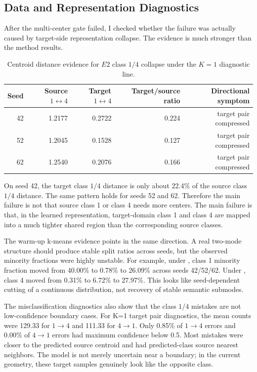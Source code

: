 \documentclass[11pt]{article}
\newcommand{\code}[1]{\texttt{\detokenize{#1}}}
\newcommand{\pct}[1]{#1\%}
\begin{document}
\subsection{Data and Representation Diagnostics}

After the multi-center gate failed, I checked whether the failure was actually caused by target-side representation collapse. The evidence is much stronger than the method results.

\begin{table}[H]
\centering
\small
\caption{Centroid distance evidence for $E2$ class $1/4$ collapse under the $K=1$ diagnostic line.}
\label{tab:centroid}
\begin{tabular}{rrrrr}
\toprule
Seed & Source $1\leftrightarrow4$ & Target $1\leftrightarrow4$ & Target/source ratio & Directional symptom \\
\midrule
42 & 1.2177 & 0.2722 & 0.224 & target pair compressed \\
52 & 1.2045 & 0.1528 & 0.127 & target pair compressed \\
62 & 1.2540 & 0.2076 & 0.166 & target pair compressed \\
\bottomrule
\end{tabular}
\end{table}

On seed 42, the target class $1/4$ distance is only about \pct{22.4} of the source class $1/4$ distance. The same pattern holds for seeds 52 and 62. Therefore the main failure is not that source class 1 or class 4 needs more centers. The main failure is that, in the learned representation, target-domain class 1 and class 4 are mapped into a much tighter shared region than the corresponding source classes.

The warm-up k-means evidence points in the same direction. A real two-mode structure should produce stable split ratios across seeds, but the observed minority fractions were highly unstable. For example, under \code{geom_balance}, class 1 minority fraction moved from \pct{40.00} to \pct{0.78} to \pct{26.09} across seeds 42/52/62. Under \code{geom_balance_div}, class 4 moved from \pct{0.31} to \pct{6.72} to \pct{27.97}. This looks like seed-dependent cutting of a continuous distribution, not recovery of stable semantic submodes.

The misclassification diagnostics also show that the class $1/4$ mistakes are not low-confidence boundary cases. For K=1 target pair diagnostics, the mean counts were 129.33 for $1\rightarrow4$ and 111.33 for $4\rightarrow1$. Only \pct{0.85} of $1\rightarrow4$ errors and \pct{0.00} of $4\rightarrow1$ errors had maximum confidence below 0.5. Most mistakes were closer to the predicted source centroid and had predicted-class source nearest neighbors. The model is not merely uncertain near a boundary; in the current geometry, these target samples genuinely look like the opposite class.
\end{document}
